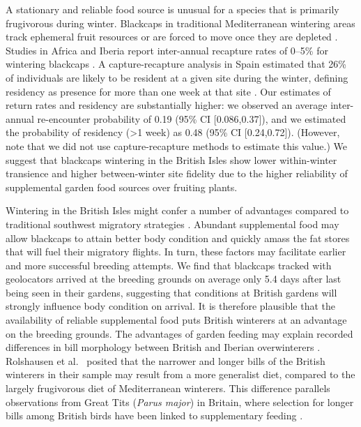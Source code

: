 \documentclass[a4paper, nobind]{templates/ociamthesis}
\begin{document}
A stationary and reliable food source is unusual for a species that is primarily frugivorous during winter. Blackcaps in traditional Mediterranean wintering areas track ephemeral fruit resources or are forced to move once they are depleted \autocite{reySpatiotemporalVariationFruit1995,telleriaFruitTrackingSites2008,beldaResidentTransientDynamics2007,cuadradoYearYearRecurrence1992}. Studies in Africa and Iberia report inter-annual recapture rates of 0--5\% for wintering blackcaps \autocite{cuadradoAllBlackcapsSylvia1995,cuadradoYearYearRecurrence1992,kingSiteFidelityRecurrence2001,loveiMigrationWinteringBlackcap1985}. A capture-recapture analysis in Spain estimated that 26\% of individuals are likely to be resident at a given site during the winter, defining residency as presence for more than one week at that site \autocite{beldaResidentTransientDynamics2007}. Our estimates of return rates and residency are substantially higher: we observed an average inter-annual re-encounter probability of 0.19 (95\% CI {[}0.086,0.37{]}), and we estimated the probability of residency (\textgreater1 week) as 0.48 (95\% CI {[}0.24,0.72{]}). (However, note that we did not use capture-recapture methods to estimate this value.) We suggest that blackcaps wintering in the British Isles show lower within-winter transience and higher between-winter site fidelity due to the higher reliability of supplemental garden food sources over fruiting plants.

Wintering in the British Isles might confer a number of advantages compared to traditional southwest migratory strategies \autocite{bertholdMigratoryBehaviourPopulation1988}. Abundant supplemental food may allow blackcaps to attain better body condition and quickly amass the fat stores that will fuel their migratory flights. In turn, these factors may facilitate earlier and more successful breeding attempts. We find that blackcaps tracked with geolocators arrived at the breeding grounds on average only 5.4 days after last being seen in their gardens, suggesting that conditions at British gardens will strongly influence body condition on arrival. It is therefore plausible that the availability of reliable supplemental food puts British winterers at an advantage on the breeding grounds. The advantages of garden feeding may explain recorded differences in bill morphology between British and Iberian overwinterers \autocite{rolshausenContemporaryEvolutionReproductive2009}. Rolshausen et al.~\autocite*{rolshausenContemporaryEvolutionReproductive2009} posited that the narrower and longer bills of the British winterers in their sample may result from a more generalist diet, compared to the largely frugivorous diet of Mediterranean winterers. This difference parallels observations from Great Tits (\emph{Parus major}) in Britain, where selection for longer bills among British birds have been linked to supplementary feeding \autocite{bosseRecentNaturalSelection2017}.
\end{document}
